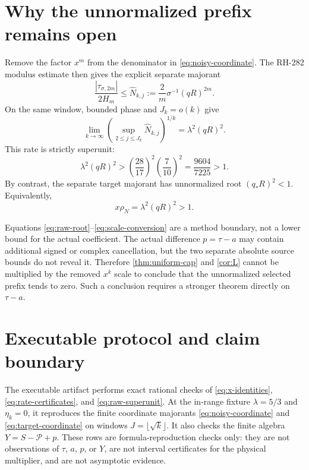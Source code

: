 \documentclass[11pt]{article}
\theoremstyle{remark}
\newcommand{\cP}{\mathcal P}
\begin{document}
\section{Why the unnormalized prefix remains open}

Remove the factor $x^{m}$ from the denominator in
\eqref{eq:noisy-coordinate}.  The RH-282 modulus estimate then gives the
explicit separate majorant
\begin{equation}\label{eq:raw-noisy-majorant}
 \frac{|\tau_{\sigma,2m}|}{2H_m}
 \le\widehat N_{k,j}
 :=\frac{2}{m}\sigma^{-1}(qR)^{2m}.
\end{equation}
On the same window, bounded phase and $J_k=o(k)$ give
\begin{equation}\label{eq:raw-root}
 \lim_{k\to\infty}
 \left(\sup_{2\le j\le J_k}\widehat N_{k,j}\right)^{1/k}
 =\lambda^2(qR)^2.
\end{equation}
This rate is strictly superunit:
\begin{equation}\label{eq:raw-superunit}
 \lambda^2(qR)^2
 >\left(\frac{28}{17}\right)^2
   \left(\frac7{10}\right)^2
 =\frac{9604}{7225}>1.
\end{equation}
By contrast, the separate target majorant has unnormalized root
$(q_*R)^2<1$.  Equivalently,
\begin{equation}\label{eq:scale-conversion}
 x\rho_N=\lambda^2(qR)^2>1.
\end{equation}

Equations \eqref{eq:raw-root}--\eqref{eq:scale-conversion} are a method
boundary, not a lower bound for the actual coefficient.  The actual
difference $p=\tau-a$ may contain additional signed or complex cancellation,
but the two separate absolute source bounds do not reveal it.  Therefore
\cref{thm:uniform-cap} and \cref{cor:L} cannot be multiplied by the removed
$x^k$ scale to conclude that the unnormalized selected prefix tends to zero.
Such a conclusion requires a stronger theorem directly on $\tau-a$.

\section{Executable protocol and claim boundary}

The executable artifact performs exact rational checks of
\eqref{eq:x-identities}, \eqref{eq:rate-certificates}, and
\eqref{eq:raw-superunit}.  At the in-range fixture $\lambda=5/3$ and
$\eta_k=0$, it reproduces the finite coordinate majorants
\eqref{eq:noisy-coordinate} and \eqref{eq:target-coordinate} on windows
$J=\lfloor\sqrt{k}\rfloor$.  It also checks the finite algebra
$Y=S-\cP+p$.  These rows are formula-reproduction checks only: they are not
observations of $\tau$, $a$, $p$, or $Y$, are not interval certificates for
the physical multiplier, and are not asymptotic evidence.
\end{document}
